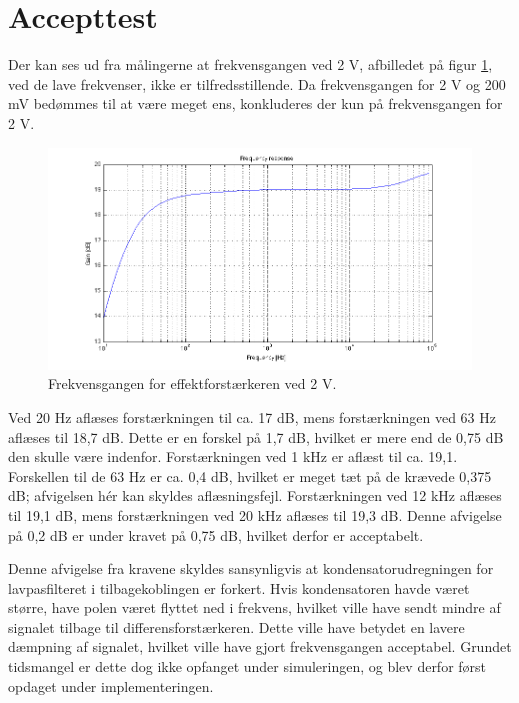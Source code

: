 \section{Accepttest}
Der kan ses ud fra målingerne at frekvensgangen ved 2 V, afbilledet på figur \ref{fig:acceff:frek2v}, ved de lave frekvenser, ikke er tilfredsstillende. Da frekvensgangen for 2 V og 200 mV bedømmes til at være meget ens, konkluderes der kun på frekvensgangen for 2 V.

\begin{figure}[h]
\centering
\includegraphics[width=\textwidth]{maalerapporter/effektforstaerker/2V-45mA-uden-modstand frek.png}
\caption{Frekvensgangen for effektforstærkeren ved 2 V.}
\label{fig:acceff:frek2v}
\end{figure}

Ved 20 Hz aflæses forstærkningen til ca. 17 dB, mens forstærkningen ved 63 Hz aflæses til 18,7 dB. Dette er en forskel på 1,7 dB, hvilket er mere end de 0,75 dB den skulle være indenfor. Forstærkningen ved 1 kHz er aflæst til ca. 19,1. Forskellen til de 63 Hz er ca. 0,4 dB, hvilket er meget tæt på de krævede 0,375 dB; afvigelsen hér kan skyldes aflæsningsfejl. Forstærkningen ved 12 kHz aflæses til 19,1 dB, mens forstærkningen ved 20 kHz aflæses til 19,3 dB. Denne afvigelse på 0,2 dB er under kravet på 0,75 dB, hvilket derfor er acceptabelt.

Denne afvigelse fra kravene skyldes sansynligvis at kondensatorudregningen for lavpasfilteret i tilbagekoblingen er forkert. Hvis kondensatoren havde været større, have polen været flyttet ned i frekvens, hvilket ville have sendt mindre af signalet tilbage til differensforstærkeren. Dette ville have betydet en lavere dæmpning af signalet, hvilket ville have gjort frekvensgangen acceptabel. Grundet tidsmangel er dette dog ikke opfanget under simuleringen, og blev derfor først opdaget under implementeringen.

